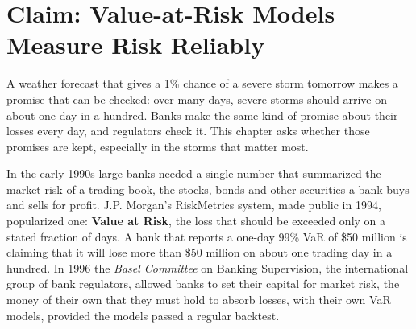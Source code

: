 \makeatletter
{}
\makeatother

\chapter{Claim: Value-at-Risk Models Measure Risk Reliably}
\label{ch:08}
\providecommand{\term}[1]{\emph{#1}}

A weather forecast that gives a 1\% chance of a severe storm tomorrow makes a promise that can be checked: over many days, severe storms should arrive on about one day in a hundred. Banks make the same kind of promise about their losses every day, and regulators check it. This chapter asks whether those promises are kept, especially in the storms that matter most.

In the early 1990s large banks needed a single number that summarized the market risk of a trading book, the stocks, bonds and other securities a bank buys and sells for profit. J.P. Morgan's RiskMetrics system, made public in 1994, popularized one: \textbf{Value at Risk}, the loss that should be exceeded only on a stated fraction of days. A bank that reports a one-day 99\% VaR of \$50 million is claiming that it will lose more than \$50 million on about one trading day in a hundred. In 1996 the \term{Basel Committee} on Banking Supervision, the international group of bank regulators, allowed banks to set their capital for market risk, the money of their own that they must hold to absorb losses, with their own VaR models, provided the models passed a regular backtest.


